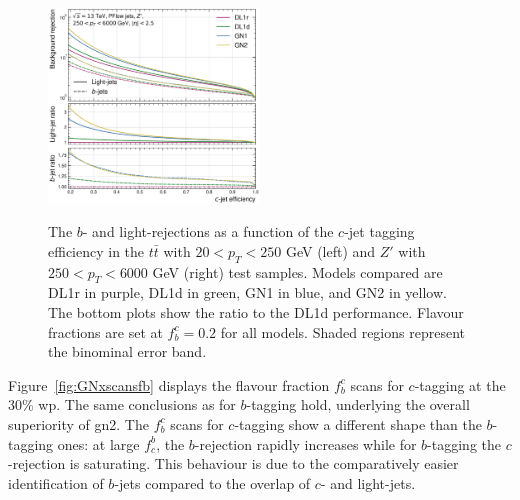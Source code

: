 \begin{center}
\begin{figure}[h!]
{  \includegraphics[width=0.50\textwidth]{Images/FTAG/GN/GN2/rocs/roc_zp_c.png}
  }
  \caption{The $b$- and light-rejections as a function of the $c$-jet tagging efficiency in the $t\bar{t}$ with $20 < p_T < 250$ GeV (left) and $Z'$ with $250 < p_T < 6000$ GeV (right) test samples. Models compared are DL1r in purple, DL1d in green, GN1 in blue, and GN2 in yellow. The bottom plots show the ratio to the DL1d performance. Flavour fractions are set at $f^c_b = 0.2$ for all models. Shaded regions represent the binominal error band.}
  \label{fig:GN2rocc}
  \end{figure}
\end{center}
 
Figure~\ref{fig:GNxscansfb} displays the flavour fraction $f^c_b$ scans for $c$-tagging at the 30\% \gls{wp}. The same conclusions as for $b$-tagging hold, underlying the overall superiority of \gls{gn2}. The $f_b^c$ scans for $c$-tagging show a different shape than the $b$-tagging ones: at large $f^b_c$, the $b$-rejection rapidly increases while for $b$-tagging the $c$-rejection is saturating. This behaviour is due to the comparatively easier identification of $b$-jets compared to the overlap of $c$- and light-jets. \\

